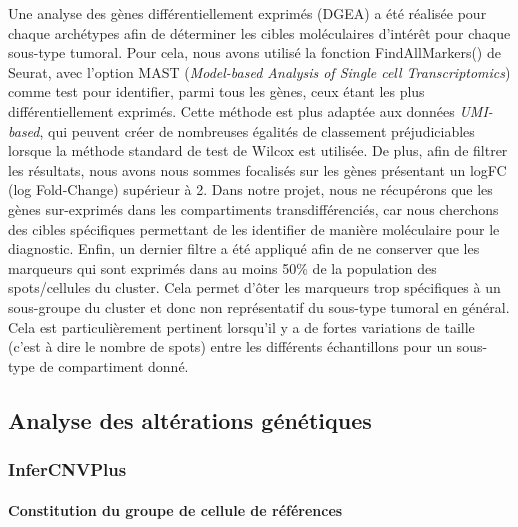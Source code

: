 \documentclass[11pt]{article}
\begin{document}
Une analyse des gènes différentiellement exprimés (DGEA) a été réalisée pour chaque archétypes afin de déterminer les cibles moléculaires d’intérêt pour chaque sous-type tumoral. Pour cela, nous avons utilisé la fonction FindAllMarkers() de Seurat, avec l’option MAST (\textit{Model-based Analysis of Single cell Transcriptomics}) comme test pour identifier, parmi tous les gènes, ceux étant les plus différentiellement exprimés. Cette méthode est plus adaptée aux données \textit{UMI-based}, qui peuvent créer de nombreuses égalités de classement préjudiciables lorsque la méthode standard de test de Wilcox est utilisée. De plus, afin de filtrer les résultats, nous avons nous sommes focalisés sur les gènes présentant un logFC (log Fold-Change) supérieur à 2. Dans notre projet, nous ne récupérons que les gènes sur-exprimés dans les compartiments transdifférenciés, car nous cherchons des cibles spécifiques permettant de les identifier de manière moléculaire pour le diagnostic. Enfin, un dernier filtre a été appliqué afin de ne conserver que les marqueurs qui sont exprimés dans au moins 50\% de la population des spots/cellules du cluster. Cela permet d’ôter les marqueurs trop spécifiques à un sous-groupe du cluster et donc non représentatif du sous-type tumoral en général. Cela est particulièrement pertinent lorsqu’il y a de fortes variations de taille (c'est à dire le nombre de spots) entre les différents échantillons pour un sous-type de compartiment donné.

\subsection{Analyse des altérations génétiques}

\subsubsection{InferCNVPlus}

\paragraph{Constitution du groupe de cellule de références}
\end{document}
